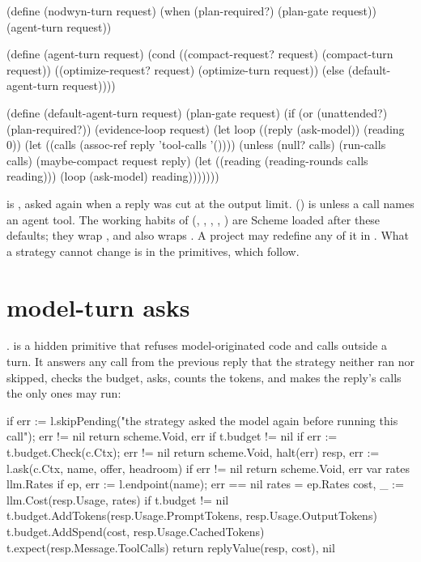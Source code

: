 \begin{scm}
(define (nodwyn-turn request)
  (when (plan-required?) (plan-gate request))
  (agent-turn request))

(define (agent-turn request)
  (cond ((compact-request? request) (compact-turn request))
        ((optimize-request? request) (optimize-turn request))
        (else (default-agent-turn request))))

(define (default-agent-turn request)
  (plan-gate request)
  (if (or (unattended?) (plan-required?))
      (evidence-loop request)
      (let loop ((reply (ask-model)) (reading 0))
        (let ((calls (assoc-ref reply 'tool-calls '())))
          (unless (null? calls)
            (run-calls calls)
            (maybe-compact request reply)
            (let ((reading (reading-rounds calls reading)))
              (loop (ask-model) reading)))))))
\end{scm}

 is , asked again when a reply was cut at
the output limit.  () is 
unless a call names an agent tool. The working habits of 
(, , ,
, ) are Scheme loaded after these
defaults; they wrap , and  also wraps
. A project may redefine any of it in
. What a strategy cannot change is in the
primitives, which follow.

\section{model-turn asks}

.  is a hidden primitive that
refuses model-originated code and calls outside a turn. It answers any call
from the previous reply that the strategy neither ran nor skipped, checks
the budget, asks, counts the tokens, and makes the reply's calls the only
ones  may run:

\begin{go}
if err := l.skipPending("the strategy asked the model again before running this call"); err != nil {
    return scheme.Void, err
}
if t.budget != nil {
    if err := t.budget.Check(c.Ctx); err != nil {
        return scheme.Void, halt(err)
    }
}
resp, err := l.ask(c.Ctx, name, offer, headroom)
if err != nil {
    return scheme.Void, err
}
var rates llm.Rates
if ep, err := l.endpoint(name); err == nil {
    rates = ep.Rates
}
cost, _ := llm.Cost(resp.Usage, rates)
if t.budget != nil {
    t.budget.AddTokens(resp.Usage.PromptTokens, resp.Usage.OutputTokens)
    t.budget.AddSpend(cost, resp.Usage.CachedTokens)
}
t.expect(resp.Message.ToolCalls)
return replyValue(resp, cost), nil
\end{go}

